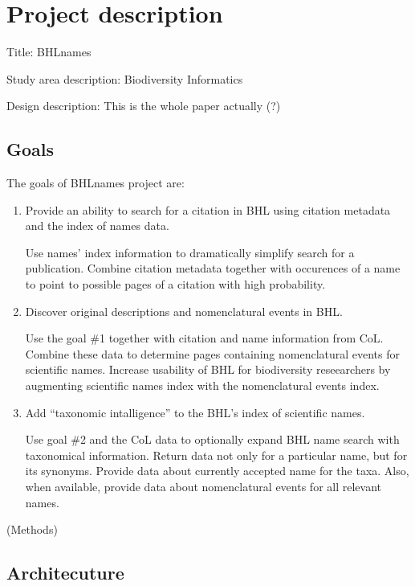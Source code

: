 \documentclass[
]{article}
\begin{document}
\hypertarget{project-description}{%
\section{Project description}\label{project-description}}

Title: BHLnames

Study area description: Biodiversity Informatics

Design description: This is the whole paper actually (?)

\hypertarget{goals}{%
\subsection{Goals}\label{goals}}

The goals of BHLnames project are:

\begin{enumerate}
\def\labelenumi{\arabic{enumi}.}
\item
  Provide an ability to search for a citation in BHL using citation
  metadata and the index of names data.

  Use names' index information to dramatically simplify search for a
  publication. Combine citation metadata together with occurences of a
  name to point to possible pages of a citation with high probability.
\item
  Discover original descriptions and nomenclatural events in BHL.

  Use the goal \#1 together with citation and name information from CoL.
  Combine these data to determine pages containing nomenclatural events
  for scientific names. Increase usability of BHL for biodiversity
  reseearchers by augmenting scientific names index with the
  nomenclatural events index.
\item
  Add ``taxonomic intalligence'' to the BHL's index of scientific names.

  Use goal \#2 and the CoL data to optionally expand BHL name search
  with taxonomical information. Return data not only for a particular
  name, but for its synonyms. Provide data about currently accepted name
  for the taxa. Also, when available, provide data about nomenclatural
  events for all relevant names.
\end{enumerate}

(Methods)

\hypertarget{architecuture}{%
\subsection{Architecuture}\label{architecuture}}
\end{document}
